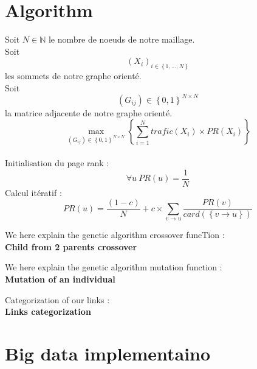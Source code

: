 \documentclass{iSWAGArticle}
\begin{document}
\section{Algorithm}
Soit $N \in \mathbb{N}$ le nombre de noeuds de notre maillage.
 \\\newline
Soit $$\left(X_i\right)_{i \in \left\{1,...,N\right\}}$$ les sommets de notre graphe orienté.
 \\\newline
Soit $$\left(G_{ij}\right)  \in \left\{0,1\right\}^{N\times N}$$ la matrice adjacente de notre graphe orienté.
\begin{equation}
\max_{\left(G_{ij}\right)  \in \left\{0,1\right\}^{N\times N}}\left\{ \sum^{N}_{i=1} trafic\left(X_i\right)\times PR(X_i)\right\}
\end{equation}
 \\\newline
Initialisation du page rank :
\begin{equation}
\forall u \ PR\left(u\right)=\frac{1}{N}
\end{equation} 
Calcul itératif :
\begin{equation}
PR\left(u\right)= \frac{\left(1-c\right)}{N} + c \times \sum_{v \rightarrow u}\frac{PR\left(v\right)}{card\left(\left\{v\rightarrow u\right\}\right)}
\end{equation}

We here explain the genetic algorithm crossover funcTion :
 \\\newline
\textbf{\large Child from 2 parents crossover}
\begin{center}
\end{center}
We here explain the genetic algorithm mutation function :
 \\\newline
\textbf{\large Mutation of an individual}
\begin{center}
\end{center}
Categorization of our links :
 \\\newline
\textbf{\large Links categorization}
\begin{center}
\end{center}

\section{Big data implementaino}



\end{document}
